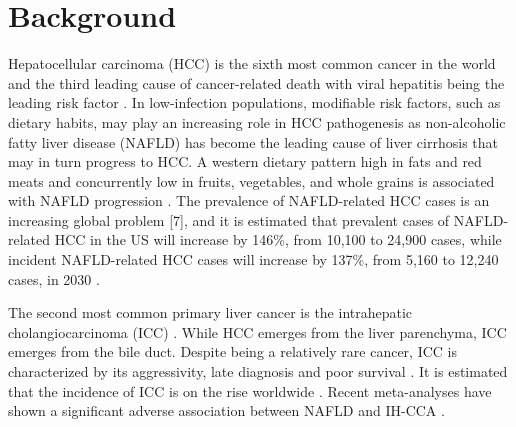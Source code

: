 \documentclass[nutrients,article,submit,moreauthors,pdftex]{Definitions/mdpi}
\begin{document}

\hypertarget{sec1}{%
\section{Background}\label{sec1}}

Hepatocellular carcinoma (HCC) is the sixth most common cancer in the
world and the third leading cause of cancer-related death with viral
hepatitis being the leading risk factor \citep{Massarweh2017}. In
low-infection populations, modifiable risk factors, such as dietary
habits, may play an increasing role in HCC pathogenesis as non-alcoholic
fatty liver disease (NAFLD) has become the leading cause of liver
cirrhosis \citep{Younossi2016, Younossi2020} that may in turn progress
to HCC. A western dietary pattern high in fats and red meats and
concurrently low in fruits, vegetables, and whole grains is associated
with NAFLD progression \citep{Guo2022}. The prevalence of NAFLD-related
HCC cases is an increasing global problem {[}7{]}, and it is estimated
that prevalent cases of NAFLD-related HCC in the US will increase by
146\%, from 10,100 to 24,900 cases, while incident NAFLD-related HCC
cases will increase by 137\%, from 5,160 to 12,240 cases, in 2030
\citep{Estes2018}.

The second most common primary liver cancer is the intrahepatic
cholangiocarcinoma (ICC) \citep{Khan2019}. While HCC emerges from the
liver parenchyma, ICC emerges from the bile duct. Despite being a
relatively rare cancer, ICC is characterized by its aggressivity, late
diagnosis and poor survival \citep{kirstein2016}. It is estimated that
the incidence of ICC is on the rise worldwide \citep{Bergquist2015}.
Recent meta-analyses have shown a significant adverse association
between NAFLD and IH-CCA \citep{Wongjarupong2017, corrao2020}.
\end{document}
